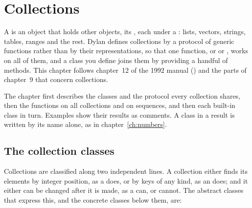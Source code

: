 \chapter{Collections}\label{ch:collections}

A  is an object that holds other objects, its
, each under a : lists, vectors, strings,
tables, ranges and the rest. Dylan defines collections by a protocol of
generic functions rather than by their representations, so that one
function,  or  or , works on all of
them, and a class you define joins them by providing a handful of
methods. This chapter follows chapter~12 of the 1992 manual
() and the parts of chapter~9 that concern
collections.

The chapter first describes the classes and the protocol every
collection shares, then the functions on all collections and on
sequences, and then each built-in class in turn. Examples show their
results as comments. A class in a result is written by its name alone,
as in chapter~\ref{ch:numbers}.

\section{The collection classes}\label{sec:collections-classes}

Collections are classified along two independent lines. A collection
either finds its elements by integer position, as a 
does, or by keys of any kind, as an  does;
and it either can be changed after it is made, as a  can, or cannot. The abstract classes that express this, and
the concrete classes below them, are:

